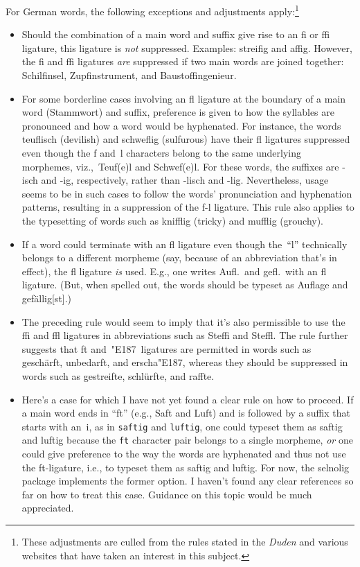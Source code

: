 \documentclass[12pt]{article}
\newcommand{\pkg}[1]{\textsf{#1}}
\newcommand{\opt}[1]{\texttt{#1}}
\begin{document}
For German words, the following exceptions and adjustments apply:\footnote{These adjustments are culled from the rules stated in the \emph{Duden} and  various websites that have taken an interest in this subject.}
\begin{itemize}
\item Should the combination of a main word and suffix give rise to an fi or ffi ligature, this ligature is \emph{not} suppressed. Examples: streifig and affig. However, the fi and ffi ligatures \emph{are} suppressed if two main words are joined together: Schilfinsel, Zupfinstrument, and Baustoffingenieur.

\item For some borderline cases involving an fl ligature at the boundary of a main word (Stammwort) and suffix, preference is given to how the syllables are pronounced and how a word would be hyphenated. For instance, the words teuflisch (devilish) and schweflig (sulfurous) have their fl ligatures suppressed even though the f and~l characters belong to the same underlying morphemes, {viz.},\ Teuf(e)l and Schwef(e)l. For these words, the suffixes are -isch and -ig, respectively, rather than -lisch and -lig. Nevertheless, usage seems to be in such cases to follow the words' pronunciation and hyphenation patterns, resulting in a suppression of the f-l ligature. This rule also applies to the typesetting of words such as knifflig (tricky) and mufflig (grouchy).

\item If a word could terminate with an fl ligature even though the~\enquote{l} technically belongs to a different morpheme (say, because of an abbreviation that's in effect), the fl ligature \emph{is} used. E.g., one writes Aufl.\ and gefl.\ with an fl ligature. (But, when spelled out, the words should be typeset as Auflage and gefällig[s\breaklig t].)

\item The preceding rule would seem to imply that it's also permissible to use the ffi and ffl ligatures in abbreviations such as Steffi and Steffl. The rule further suggests that ft and~\char"E187\ ligatures are permitted in words such as geschärft, unbedarft, and erscha\char"E187, whereas they should be suppressed in words such as gestreifte, schlürfte, and raffte.

\item Here's a case for which I have not yet found a clear rule on how to proceed. If a main word ends in \enquote{ft} (e.g., Saft and Luft) and is followed by a suffix that starts with an~i, as in \opt{saftig} and \opt{luftig}, one could typeset them as saftig and luftig because the \opt{ft} character pair belongs to a single morpheme, \emph{or} one could give preference to the way the words are hyphenated and thus not use the ft-ligature, i.e., to typeset them as saf\breaklig tig and luf\breaklig tig. For now, the \pkg{selnolig} package implements the former option. I haven't found any clear references so far on how to treat this case. Guidance on this topic would be much appreciated.

\end{itemize}
\end{document}
